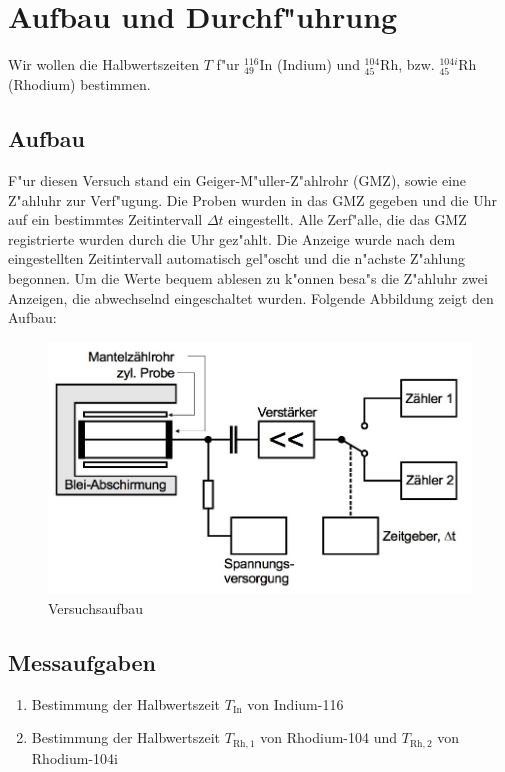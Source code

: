 \section{Aufbau und Durchf"uhrung}
	\label{sec:durchfuehrung}

	Wir wollen die Halbwertszeiten $T$ f"ur ${}_{49}^{116}\mathrm{In}$ (Indium) und ${}_{45}^{104}\mathrm{Rh}$, bzw. ${}_{45}^{104i}\mathrm{Rh}$ (Rhodium) bestimmen.

	\subsection{Aufbau}
		\label{subsec:aufbau}
		F"ur diesen Versuch stand ein Geiger-M"uller-Z"ahlrohr (GMZ), sowie eine Z"ahluhr zur Verf"ugung.
		Die Proben wurden in das GMZ gegeben und die Uhr auf ein bestimmtes Zeitintervall $\Delta t$ eingestellt.
		Alle Zerf"alle, die das GMZ registrierte wurden durch die Uhr gez"ahlt.
		Die Anzeige wurde nach dem eingestellten Zeitintervall automatisch gel"oscht und die n"achste Z"ahlung begonnen.
		Um die Werte bequem ablesen zu k"onnen besa"s die Z"ahluhr zwei Anzeigen, die abwechselnd eingeschaltet wurden.
		Folgende Abbildung zeigt den Aufbau:

		\begin{figure}[!h]
			\centering
			\includegraphics[width = 15cm]{img/aufbau.jpg}
			\caption{Versuchsaufbau \cite{anleitung}}
			\label{fig:aufbau}
		\end{figure}

	\subsection{Messaufgaben}
		\label{subsec:aufgaben}
		\begin{enumerate}
			\item{Bestimmung der Halbwertszeit $T_\mathrm{In}$ von Indium-116}
			\item{Bestimmung der Halbwertszeit $T_{\mathrm{Rh}, 1}$ von Rhodium-104 und $T_{\mathrm{Rh}, 2}$ von Rhodium-104i}
		\end{enumerate}
